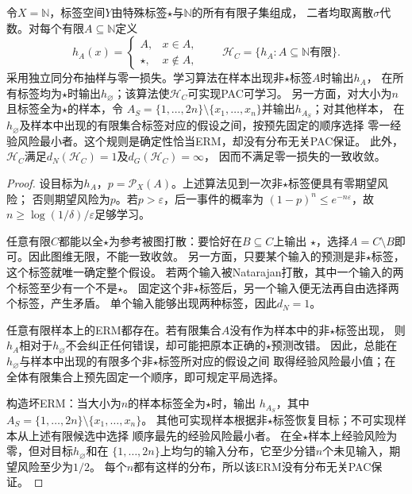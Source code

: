 \begin{theorem}[可学习性不推出一致收敛]
\label{thm:multiclass-erm-separation}
令$X=\mathbb N$，标签空间$Y$由特殊标签$\star$与$\mathbb N$的所有有限子集组成，
二者均取离散$\sigma$代数。对每个有限$A\subseteq\mathbb N$定义
\[
 h_A(x)=\begin{cases}A,&x\in A,\\\star,&x\notin A,\end{cases}
 \qquad
 \mathcal H_C=\{h_A:A\subseteq\mathbb N\text{有限}\}.
\]
采用独立同分布抽样与零一损失。学习算法在样本出现非$\star$标签$A$时输出$h_A$，
在所有标签均为$\star$时输出$h_{\varnothing}$；该算法使$\mathcal H_C$可实现PAC可学习。
另一方面，对大小为$n$且标签全为$\star$的样本，令
$A_S=\{1,\ldots,2n\}\setminus\{x_1,\ldots,x_n\}$并输出$h_{A_S}$；对其他样本，
在$h_{\varnothing}$及样本中出现的有限集合标签对应的假设之间，按预先固定的顺序选择
零一经验风险最小者。这个规则是确定性恰当ERM，却没有分布无关PAC保证。
此外，$\mathcal H_C$满足$d_N(\mathcal H_C)=1$及$d_G(\mathcal H_C)=\infty$，
因而不满足零一损失的一致收敛。
\end{theorem}

\begin{proof}
设目标为$h_A$，$p=\mathcal P_X(A)$。上述算法见到一次非$\star$标签便具有零期望风险；
否则期望风险为$p$。若$p>\varepsilon$，后一事件的概率为
$(1-p)^n\leq e^{-n\varepsilon}$，故$n\geq\log(1/\delta)/\varepsilon$足够学习。

任意有限$C$都能以全$\star$为参考被图打散：要恰好在$B\subseteq C$上输出
$\star$，选择$A=C\setminus B$即可。因此图维无限，不能一致收敛。
另一方面，只要某个输入的预测是非$\star$标签，这个标签就唯一确定整个假设。
若两个输入被Natarajan打散，其中一个输入的两个标签至少有一个不是$\star$。
固定这个非$\star$标签后，另一个输入便无法再自由选择两个标签，产生矛盾。
单个输入能够出现两种标签，因此$d_N=1$。

任意有限样本上的ERM都存在。若有限集合$A$没有作为样本中的非$\star$标签出现，
则$h_A$相对于$h_{\varnothing}$不会纠正任何错误，却可能把原本正确的$\star$预测改错。
因此，总能在$h_{\varnothing}$与样本中出现的有限多个非$\star$标签所对应的假设之间
取得经验风险最小值；在全体有限集合上预先固定一个顺序，即可规定平局选择。

构造坏ERM：当大小为$n$的样本标签全为$\star$时，输出
$h_{A_S}$，其中$A_S=\{1,\ldots,2n\}\setminus\{x_1,\ldots,x_n\}$。
其他可实现样本根据非$\star$标签恢复目标；不可实现样本从上述有限候选中选择
顺序最先的经验风险最小者。
在全$\star$样本上经验风险为零，但对目标$h_{\varnothing}$和在
$\{1,\ldots,2n\}$上均匀的输入分布，它至少分错$n$个未见输入，期望风险至少为$1/2$。
每个$n$都有这样的分布，所以该ERM没有分布无关PAC保证。
\end{proof}

